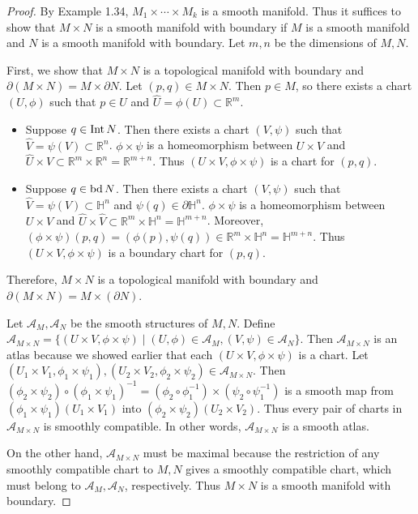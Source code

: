 \begin{proof}
  By Example 1.34, $M_1 \times \cdots \times M_k$ is a smooth manifold.
  Thus it suffices to show that $M \times N$ is a smooth manifold with boundary if $M$ is a smooth manifold and $N$ is a smooth manifold with boundary.
  Let $m, n$ be the dimensions of $M, N$.

  First, we show that $M \times N$ is a topological manifold with boundary and $\partial(M \times N) = M \times \partial N$.
  Let $(p, q) \in M \times N$.
  Then $p \in M$, so there exists a chart $(U, \phi)$ such that $p \in U$ and $\hat{U} = \phi(U) \subset \mathbb{R}^m$.

  \begin{itemize}
    \item
      Suppose $q \in \operatorname{Int} N$.
      Then there exists a chart $(V, \psi)$ such that $\hat{V} = \psi(V) \subset \mathbb{R}^n$.
      $\phi \times \psi$ is a homeomorphism between $U \times V$ and $\hat{U} \times \hat{V} \subset \mathbb{R}^m \times \mathbb{R}^n = \mathbb{R}^{m + n}$.
      Thus $(U \times V, \phi \times \psi)$ is a chart for $(p, q)$.
    \item
      Suppose $q \in \operatorname{bd} N$.
      Then there exists a chart $(V, \psi)$ such that $\hat{V} = \psi(V) \subset \mathbb{H}^n$ and $\psi(q) \in \partial \mathbb{H}^n$.
      $\phi \times \psi$ is a homeomorphism between $U \times V$ and $\hat{U} \times \hat{V} \subset \mathbb{R}^m \times \mathbb{H}^n = \mathbb{H}^{m + n}$.
      Moreover, $(\phi \times \psi)(p, q) = (\phi(p), \psi(q)) \in \mathbb{R}^m \times \mathbb{H}^n = \mathbb{H}^{m + n}$.
      Thus $(U \times V, \phi \times \psi)$ is a boundary chart for $(p, q)$.
  \end{itemize}

  Therefore, $M \times N$ is a topological manifold with boundary and $\partial (M \times N) = M \times (\partial N)$.

  Let $\mathcal{A}_M, \mathcal{A}_N$ be the smooth structures of $M, N$.
  Define $\mathcal{A}_{M \times N} = \{ (U \times V, \phi \times \psi) \mid (U, \phi) \in \mathcal{A}_M, (V, \psi) \in \mathcal{A}_N \}$.
  Then $\mathcal{A}_{M \times N}$ is an atlas because we showed earlier that each $(U \times V, \phi \times \psi)$ is a chart.
  Let $(U_1 \times V_1, \phi_1 \times \psi_1), (U_2 \times V_2, \phi_2 \times \psi_2) \in \mathcal{A}_{M \times N}$.
  Then $(\phi_2 \times \psi_2) \circ (\phi_1 \times \psi_1)^{-1} = (\phi_2 \circ \phi_1^{-1}) \times (\psi_2 \circ \psi_1^{-1})$ is a smooth map from $(\phi_1 \times \psi_1)(U_1 \times V_1)$ into $(\phi_2 \times \psi_2)(U_2 \times V_2)$.
  Thus every pair of charts in $\mathcal{A}_{M \times N}$ is smoothly compatible.
  In other words, $\mathcal{A}_{M \times N}$ is a smooth atlas.

  On the other hand, $\mathcal{A}_{M \times N}$ must be maximal because the restriction of any smoothly compatible chart to $M, N$ gives a smoothly compatible chart, which must belong to $\mathcal{A}_M, \mathcal{A}_N$, respectively.
  Thus $M \times N$ is a smooth manifold with boundary.
\end{proof}
